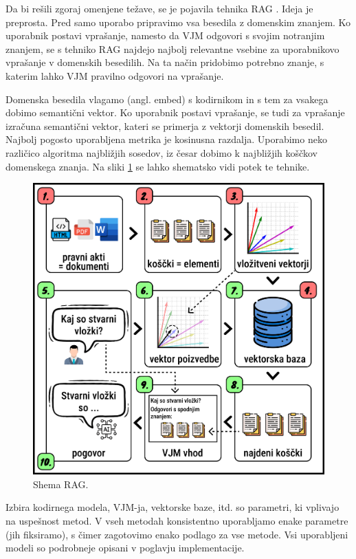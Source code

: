 \documentclass[a4paper,12pt,openright]{book}
\begin{document}
Da bi rešili zgoraj omenjene težave, se je pojavila tehnika RAG \cite{rag}. Ideja je preprosta. Pred samo uporabo pripravimo vsa besedila z domenskim znanjem. Ko uporabnik postavi vprašanje, namesto da VJM odgovori s svojim notranjim znanjem, se s tehniko RAG najdejo najbolj relevantne vsebine za uporabnikovo vprašanje v domenskih besedilih. Na ta način pridobimo potrebno znanje, s katerim lahko VJM pravilno odgovori na vprašanje.

Domenska besedila vlagamo (angl. embed) s kodirnikom in s tem za vsakega dobimo semantični vektor. Ko uporabnik postavi vprašanje, se tudi za vprašanje izračuna semantični vektor, kateri se primerja z vektorji domenskih besedil. Najbolj pogosto uporabljena metrika je kosinusna razdalja. Uporabimo neko različico algoritma najbližjih sosedov, iz česar dobimo k najbližjih koščkov domenskega znanja. Na sliki \ref{rag_shema} se lahko shematsko vidi potek te tehnike.

\begin{figure}[htbp]
    \centering
    \includegraphics[width=\textwidth]{rag_shema.png}
    \caption{Shema RAG.}
    \label{rag_shema}
\end{figure}

Izbira kodirnega modela, VJM-ja, vektorske baze, itd. so parametri, ki vplivajo na uspešnost metod. V vseh metodah konsistentno uporabljamo enake parametre (jih fiksiramo), s čimer zagotovimo enako podlago za vse metode. Vsi uporabljeni modeli so podrobneje opisani v poglavju implementacije.
\end{document}
